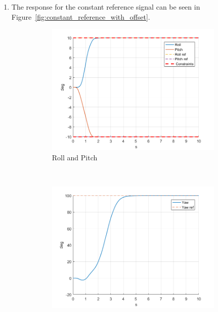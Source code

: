 \documentclass[11pt]{article}
\begin{document}
\begin{enumerate}
    \item The response for the constant reference signal can be seen in
    Figure~\ref{fig:constant_reference_with_offset}.
    \begin{figure}[ht]
        \centering
        \begin{subfigure}[c]{0.3\linewidth}
            \centering
            \includegraphics[width=\linewidth]{Plots_05_ReferenceTracking_Constant/01}
            \caption{Roll and Pitch}
        \end{subfigure}
        ~
        \begin{subfigure}[c]{0.3\linewidth}
            \centering
            \includegraphics[width=\linewidth]{Plots_05_ReferenceTracking_Constant/02}

\end{subfigure}
\end{figure}
\end{enumerate}
\end{document}
